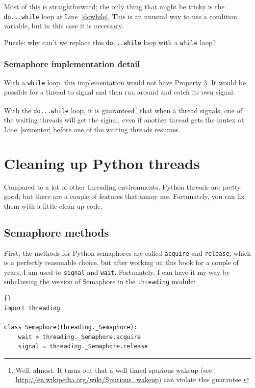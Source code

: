 \documentclass{book}
\newcommand{\clearemptydoublepage}{\newpage\cleardoublepage}
\begin{document}
Most of this is straightforward; the only thing that might be 
tricky is the {\tt do...while} loop at Line~\ref{dowhile}.
This is an unusual way to use a condition variable, but in
this case it is necessary.

Puzzle: why can't we replace this {\tt do...while} loop
with a {\tt while} loop?

\clearemptydoublepage
\subsection{Semaphore implementation detail}

With a {\tt while} loop, this implementation would not have
Property 3.  It would be possible for a thread to signal
and then run around and catch its own signal.

With the {\tt do...while} loop, it is guaranteed\footnote{Well,
  almost.  It turns out that a well-timed spurious wakeup (see
  \url{http://en.wikipedia.org/wiki/Spurious_wakeup}) can violate this
  guarantee.} that when a thread signals, one of the waiting threads
will get the signal, even if another thread gets the mutex at
Line~\ref{sementer} before one of the waiting threads resumes.





\appendix

\chapter{Cleaning up Python threads}
\label{cleanup}

Compared to a lot of other threading environments, Python threads are
pretty good, but there are a couple of features that annoy me.
Fortunately, you can fix them with a little clean-up code.

\section{Semaphore methods}

First, the methods for Python semaphores are called {\tt acquire}
and {\tt release}, which is a perfectly reasonable choice, but
after working on this book for a couple of years, I am used
to {\tt signal} and {\tt wait}.  Fortunately, I can have it
my way by subclassing the version of Semaphore in the
{\tt threading} module:

\begin{latin}
\begin{lstlisting}[title={Semaphore name change}]{}
import threading
 
class Semaphore(threading._Semaphore):
    wait = threading._Semaphore.acquire
    signal = threading._Semaphore.release
\end{lstlisting}
\end{latin}
\end{document}
